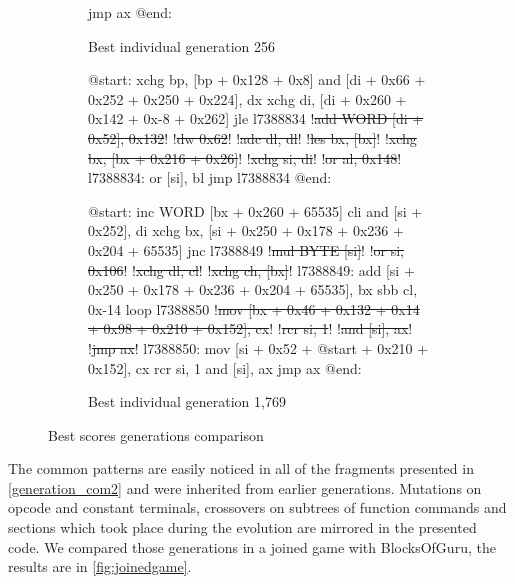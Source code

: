 \documentclass[dvipsnames,format=sigconf,anonymous=true,review=true]{acmart}
\begin{document}
\begin{figure}
\begin{subfigure}[t]{0.32\textwidth}
\begin{assembly}
    jmp ax
    @end:
    \end{assembly}
    \caption{Best individual generation 256}
\end{subfigure}
\hfill
\begin{subfigure}[t]{0.32\textwidth}
    \begin{assembly}
    @start:
    xchg bp, [bp + 0x128 + 0x8]
    and [di + 0x66 + 0x252 + 0x250 + 0x224], dx
    xchg di, [di + 0x260 + 0x142 + 0x-8 + 0x262]
    jle l7388834
    !\sout{add WORD [di + 0x52], 0x132}!
    !\sout{dw 0x62}!
    !\sout{adc dl, dl}!
    !\sout{les bx, [bx]}!
    !\sout{xchg bx, [bx + 0x216 + 0x26]}!
    !\sout{xchg si, di}!
    !\sout{or al, 0x148}!
    l7388834:
    or [si], bl
    jmp l7388834
    @end:
    \end{assembly}
    \begin{assembly}
    @start:
    inc WORD [bx + 0x260 + 65535]
    cli
    and [si + 0x252], di
    xchg bx, [si + 0x250 + 0x178 + 0x236 + 0x204 + 65535]
    jnc l7388849
    !\sout{mul BYTE [si]}!
    !\sout{or si, 0x106}!
    !\sout{xchg dl, cl}!
    !\sout{xchg ch, [bx]}!
    l7388849:
    add [si + 0x250 + 0x178 + 0x236 + 0x204 + 65535], bx
    sbb cl, 0x-14
    loop l7388850
    !\sout{mov [bx + 0x46 + 0x132 + 0x14 + 0x98 + 0x210 + 0x152], cx}!
    !\sout{rcr si, 1}!
    !\sout{and [si], ax}!
    !\sout{jmp ax}!
    l7388850:
    mov [si + 0x52 + @start + 0x210 + 0x152], cx
    rcr si, 1
    and [si], ax
    jmp ax
    @end:
    \end{assembly}
    \caption{Best individual generation 1,769}
\end{subfigure}
\caption{Best scores generations comparison}
\label{generation_com2}
\end{figure}

The common patterns are easily noticed in all of the fragments presented in \autoref{generation_com2} and were inherited from earlier generations. Mutations on opcode and constant terminals, crossovers on subtrees of function commands and sections which took place during the evolution are mirrored in the presented code. 
We compared those generations in a joined game with BlocksOfGuru, the results are in \autoref{fig:joinedgame}.
\end{document}
